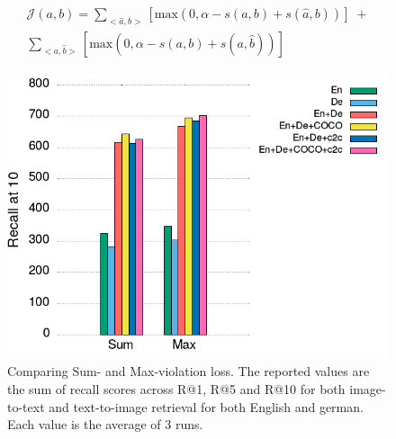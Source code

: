 \begin{equation}
\label{eq:sumviol}
\begin{split}
\mathcal{J}(a, b) = \sum_{<\hat{a}, b>}[\text{max}(0, \alpha - s(a,b) + s(\hat{a}, b))] \;+ \\ \sum_{<a, \hat{b}>}[\text{max}(0, \alpha - s(a,b) + s(a, \hat{b}))]
\end{split}
\end{equation}




\begin{figure}
    \centering
    \includegraphics[scale=0.45]{assets/summax.png}
    \caption{Comparing Sum- and Max-violation loss. The reported values are the sum of recall scores 
            across R@1, R@5 and R@10 for both image-to-text and text-to-image retrieval for both English and german.
            Each value is the average of 3 runs.}
    \label{fig:summax}
\end{figure}